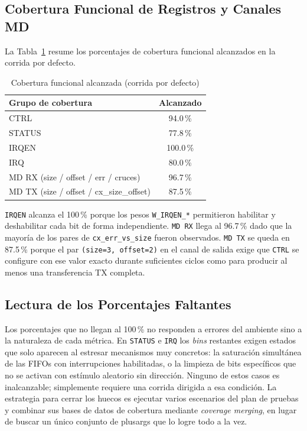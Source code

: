 \documentclass[conference]{IEEEtran}
\begin{document}
\subsection{Cobertura Funcional de Registros y Canales MD}
\label{sec:cov_funcional}

La Tabla~\ref{tab:cobertura} resume los porcentajes de cobertura funcional
alcanzados en la corrida por defecto.

\begin{table}[H]
\caption{Cobertura funcional alcanzada (corrida por defecto)}
\label{tab:cobertura}
\centering
\footnotesize
\begin{tabular}{@{}lc@{}}
\toprule
\textbf{Grupo de cobertura} & \textbf{Alcanzado} \\
\midrule
CTRL                         & 94.0\,\%  \\
STATUS                       & 77.8\,\%  \\
IRQEN                        & 100.0\,\% \\
IRQ                          & 80.0\,\%  \\
\midrule
MD RX (size / offset / err / cruces) & 96.7\,\%  \\
MD TX (size / offset / cx\_size\_offset) & 87.5\,\%  \\
\bottomrule
\end{tabular}
\end{table}

\texttt{IRQEN} alcanza el 100\,\% porque los pesos \texttt{W\_IRQEN\_*}
permitieron habilitar y deshabilitar cada bit de forma independiente.
\texttt{MD RX} llega al 96.7\,\% dado que la mayoría de los pares de
\texttt{cx\_err\_vs\_size} fueron observados. \texttt{MD TX} se queda en
87.5\,\% porque el par \texttt{(size=3, offset=2)} en el canal de salida
exige que \texttt{CTRL} se configure con ese valor exacto durante suficientes
ciclos como para producir al menos una transferencia TX completa.

\subsection{Lectura de los Porcentajes Faltantes}

Los porcentajes que no llegan al 100\,\% no responden a errores del ambiente
sino a la naturaleza de cada métrica. En \texttt{STATUS} e \texttt{IRQ} los
\textit{bins} restantes exigen estados que solo aparecen al estresar mecanismos
muy concretos: la saturación simultánea de las FIFOs con interrupciones
habilitadas, o la limpieza de bits específicos que no se activan con estímulo
aleatorio sin dirección. Ninguno de estos casos es inalcanzable; simplemente
requiere una corrida dirigida a esa condición. La estrategia para cerrar los
huecos es ejecutar varios escenarios del plan de pruebas y combinar sus bases de
datos de cobertura mediante \textit{coverage merging}, en lugar de buscar un
único conjunto de plusargs que lo logre todo a la vez.
\end{document}

